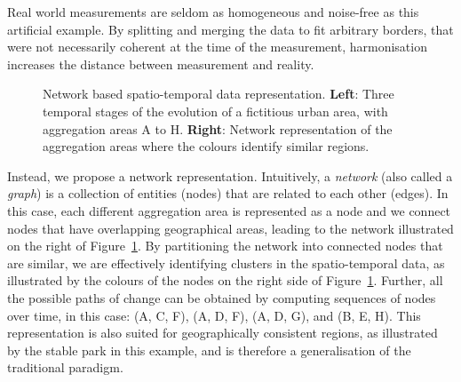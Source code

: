 Real world measurements are seldom as homogeneous and noise-free as this
artificial example. By splitting and merging the data to fit arbitrary borders,
that were not necessarily coherent at the time of the measurement, harmonisation
increases the distance between measurement and reality.


\begin{figure}
    \centering 
     \caption{Network based spatio-temporal data representation. \textbf{Left}:
    Three temporal stages of the evolution of a fictitious urban area, with
    aggregation areas A to H. \textbf{Right}: Network representation of the
    aggregation areas where the colours identify similar regions.
        \label{fig:intuition}}
\end{figure}

Instead, we propose a network representation. Intuitively, a \emph{network}
(also called a \emph{graph}) is a collection of entities (nodes) that are
related to each other (edges). In this case, each different aggregation area is
represented as a node and we connect nodes that have overlapping geographical
areas, leading to the network illustrated on the right of
Figure~\ref{fig:intuition}. By partitioning the network into connected nodes
that are similar, we are effectively identifying clusters in the spatio-temporal
data, as illustrated by the colours of the nodes on the right side of
Figure~\ref{fig:intuition}. Further, all the possible paths of change can be
obtained by computing sequences of nodes over time, in this case: (A, C, F), (A,
D, F), (A, D, G), and (B, E, H). This representation is also suited for
geographically consistent regions, as illustrated by the stable park in this
example, and is therefore a generalisation of the traditional paradigm.

